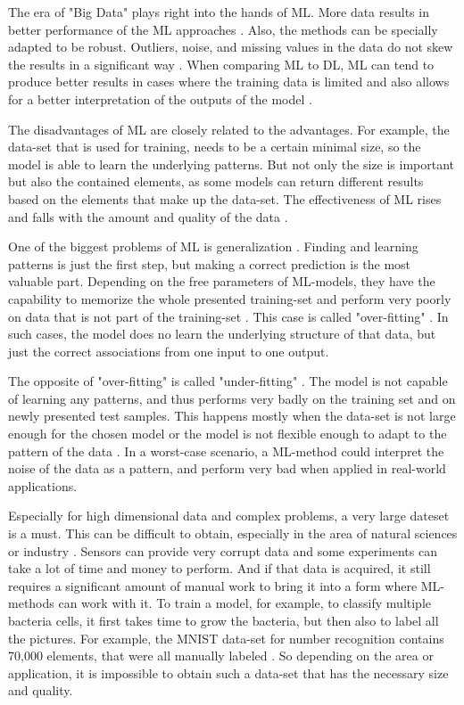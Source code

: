 The era of "Big Data" plays right into the hands of ML. More data results in better performance of the ML approaches \cite{Wuest}. Also, the methods can be specially adapted to be robust. Outliers, noise, and missing values in the data do not skew the results in a significant way \cite{Theodoridis}. When comparing ML to DL, ML can tend to produce better results in cases where the training data is limited and also allows for a better interpretation of the outputs of the model \cite{Janiesch}.

The disadvantages of ML are closely related to the advantages. For example, the data-set that is used for training, needs to be a certain minimal size, so the model is able to learn the underlying patterns. But not only the size is important but also the contained elements, as some models can return different results based on the elements that make up the data-set. The effectiveness of ML rises and falls with the amount and quality of the data \cite{Janiesch, Bishop}.

One of the biggest problems of ML is generalization \cite{Bishop}. Finding and learning patterns is just the first step, but making a correct prediction is the most valuable part. Depending on the free parameters of ML-models, they have the capability to memorize the whole presented training-set and perform very poorly on data that is not part of the training-set \cite{Zhangpiml}. This case is called "over-fitting" \cite{Jabbar}. In such cases, the model does no learn the underlying structure of that data, but just the correct associations from one input to one output. 

The opposite of "over-fitting" is called "under-fitting" \cite{Jabbar}. The model is not capable of learning any patterns, and thus performs very badly on the training set and on newly presented test samples. This happens mostly when the data-set is not large enough for the chosen model or the model is not flexible enough to adapt to the pattern of the data \cite{Will}. In a worst-case scenario, a ML-method could interpret the noise of the data as a pattern, and perform very bad when applied in real-world applications.

Especially for high dimensional data and complex problems, a very large dateset is a must. This can be difficult to obtain, especially in the area of natural sciences or industry \cite{Wuest}. Sensors can provide very corrupt data and some experiments can take a lot of time and money to perform. And if that data is acquired, it still requires a significant amount of manual work to bring it into a form where ML-methods can work with it. To train a model, for example, to classify multiple bacteria cells, it first takes time to grow the bacteria, but then also to label all the pictures. For example, the MNIST data-set for number recognition contains 70,000 elements, that were all manually labeled \cite{Pavlo}. So depending on the area or application, it is impossible to obtain such a data-set that has the necessary size and quality. 

